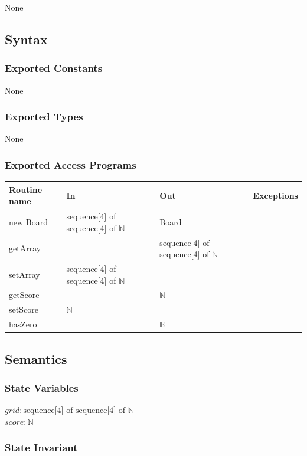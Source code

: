 \documentclass[12pt]{article}
\begin{document}
None

\subsection* {Syntax}

\subsubsection* {Exported Constants}

None

\subsubsection* {Exported Types}

None

\subsubsection* {Exported Access Programs}

\begin{tabular}{| l | l | l | p{5cm} |}
\hline
\textbf{Routine name} & \textbf{In} & \textbf{Out} & \textbf{Exceptions}\\
\hline
new Board & sequence[4] of sequence[4] of $\mathbb{N}$ & Board & \\
\hline
getArray & & sequence[4] of sequence[4] of $\mathbb{N}$ & ~\\
\hline
setArray & sequence[4] of sequence[4] of $\mathbb{N}$ & & ~\\
\hline
getScore & & $\mathbb{N}$ &~\\
\hline 
setScore & $\mathbb{N}$ & & ~\\
\hline
hasZero & & $\mathbb{B}$ &~\\
\hline
\end{tabular}

\subsection* {Semantics}

\subsubsection* {State Variables}

$\mathit{grid}: \text{sequence[4] of sequence[4] of } \mathbb{N}$\\
$\mathit{score}: \mathbb{N}$

\subsubsection* {State Invariant}
\end{document}
